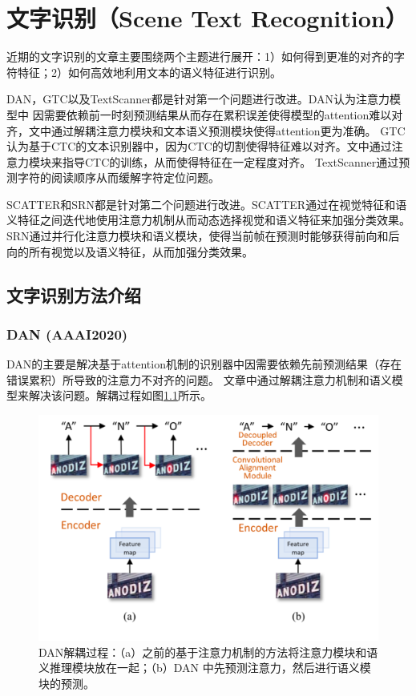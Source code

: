 \chapter{文字识别（Scene Text Recognition）}
近期的文字识别的文章主要围绕两个主题进行展开：1）如何得到更准的对齐的字符特征；2）如何高效地利用文本的语义特征进行识别。

DAN\cite{wang2019decoupled}，GTC\cite{hu2020gtc}以及TextScanner\cite{wan2019textscanner}都是针对第一个问题进行改进。DAN认为注意力模型中
因需要依赖前一时刻预测结果从而存在累积误差使得模型的attention难以对齐，文中通过解耦注意力模块和文本语义预测模块使得attention更为准确。
GTC认为基于CTC的文本识别器中，因为CTC的切割使得特征难以对齐。文中通过注意力模块来指导CTC的训练，从而使得特征在一定程度对齐。
TextScanner通过预测字符的阅读顺序从而缓解字符定位问题。

SCATTER\cite{scatter}和SRN\cite{2020srn}都是针对第二个问题进行改进。SCATTER通过在视觉特征和语义特征之间迭代地使用注意力机制从而动态选择视觉和语义特征来加强分类效果。
SRN通过并行化注意力模块和语义模块，使得当前帧在预测时能够获得前向和后向的所有视觉以及语义特征，从而加强分类效果。
\section{文字识别方法介绍}
\subsection{DAN (AAAI2020)}
DAN\cite{wang2019decoupled}的主要是解决基于attention机制的识别器中因需要依赖先前预测结果（存在错误累积）所导致的注意力不对齐的问题。
文章中通过解耦注意力机制和语义模型来解决该问题。解耦过程如图\ref{dan_introduction}所示。
\begin{figure}[H]
    \centering
    \includegraphics[width=.6\textwidth]{figure/recognition/dan_introduction.png} 
    \caption{DAN解耦过程：（a）之前的基于注意力机制的方法将注意力模块和语义推理模块放在一起；（b）DAN
    中先预测注意力，然后进行语义模块的预测。} 
    \label{dan_introduction} 
\end{figure}

